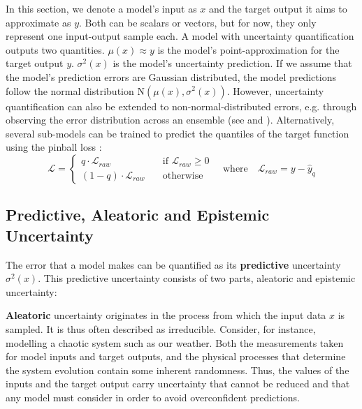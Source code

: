 \newpar In this section, we denote a model's input as $x$ and the target output it aims to approximate as $y$. Both can be scalars or vectors, but for now, they only represent one input-output sample each. A model with uncertainty quantification outputs two quantities. $\mu(x) \approx y$ is the model's point-approximation for the target output $y$. $\sigma^2(x)$ is the model's uncertainty prediction. If we assume that the model's prediction errors are Gaussian distributed, the model predictions follow the normal distribution $\text{N}(\mu(x), \sigma^2(x))$. However, uncertainty quantification can also be extended to non-normal-distributed errors, e.g. through observing the error distribution across an ensemble (see  and ). Alternatively, several sub-models can be trained to predict the quantiles of the target function using the pinball loss \cite{regression-quantiles-1978, deep-quantiles-2022}:
\begin{equation*}
    \mathcal{L} = \begin{cases}
        q \cdot \mathcal{L}_{raw} \quad &\text{if } \mathcal{L}_{raw} \geq 0 \\
        (1-q) \cdot \mathcal{L}_{raw} \quad &\text{otherwise}
    \end{cases} \quad \text{where} \quad \mathcal{L}_{raw} = y - \hat{y}_{q}
\end{equation*}

\subsection{Predictive, Aleatoric and Epistemic Uncertainty} \label{txt:aleatoic-epistemic-uncertainty}

The error that a model makes can be quantified as its \textbf{predictive} uncertainty $\sigma^2(x)$. This predictive uncertainty consists of two parts, aleatoric and epistemic uncertainty:

\textbf{Aleatoric} uncertainty originates in the process from which the input data $x$ is sampled. It is thus often described as irreducible. Consider, for instance, modelling a chaotic system such as our weather. Both the measurements taken for model inputs and target outputs, and the physical processes that determine the system evolution contain some inherent randomness. Thus, the values of the inputs and the target output carry uncertainty that cannot be reduced and that any model must consider in order to avoid overconfident predictions.

